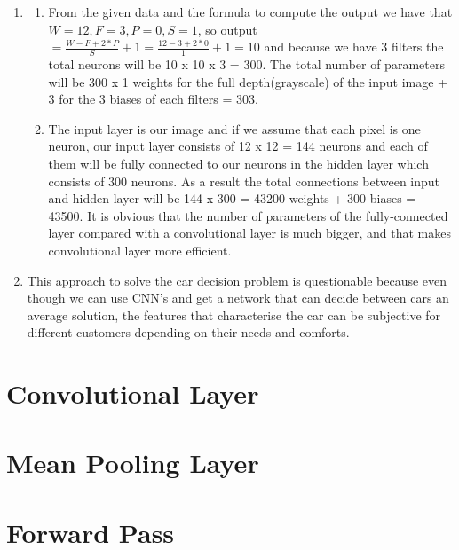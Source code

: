 \documentclass{article}
\begin{document}
\begin{enumerate}
\item 
\begin{enumerate}
\item From the given data and the formula to compute the output we have that \(W=12, F=3, P=0, S=1\), so output \(= \frac{W - F + 2 * P}{S}+1 = \frac{12 - 3 + 2 * 0}{1}+1=  10\) and because we have 3 filters the total neurons will be 10 x 10 x 3 = 300. The total number of parameters will be 300 x 1 weights for the full depth(grayscale) of the input image + 3 for the 3 biases of each filters = 303.\\
\item
 The input layer is our image and if we assume that each pixel is one neuron, our input layer consists of 12 x 12 = 144 neurons and each of them will be fully connected to our neurons in the hidden layer which consists of 300 neurons. As a result the total connections between input and hidden layer will be 144 x 300 = 43200 weights + 300 biases = 43500. It is obvious that the number of parameters of the fully-connected layer compared with a convolutional layer is much bigger, and that makes convolutional layer more efficient. \\
\end{enumerate}
\item This approach to solve the car decision problem is questionable because even though we can use CNN's and get a network that can decide between cars an average solution, the features that characterise the car can be subjective for different customers depending on their needs and comforts.
\end{enumerate}
\setcounter{section}{+3}
\section{Convolutional Layer}

\section{Mean Pooling Layer}

\section{Forward Pass}

\end{document}
